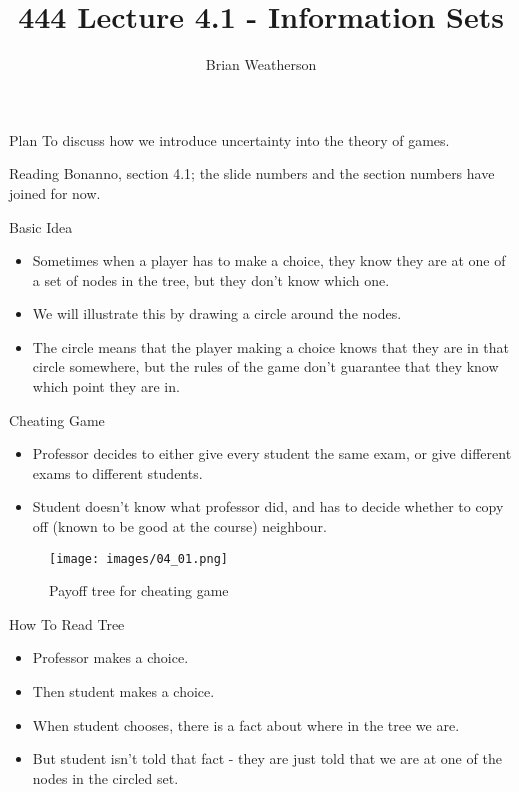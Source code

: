 \documentclass[
  ignorenonframetext,
]{beamer}
\title{444 Lecture 4.1 - Information Sets}
\author{Brian Weatherson}
\date{}
\providecommand{\tightlist}{%
  \setlength{\itemsep}{0pt}\setlength{\parskip}{0pt}}
\begin{document}
\frame{\titlepage}

\begin{frame}{Plan}
\protect\hypertarget{plan}{}
To discuss how we introduce uncertainty into the theory of games.
\end{frame}

\begin{frame}{Reading}
\protect\hypertarget{reading}{}
Bonanno, section 4.1; the slide numbers and the section numbers have
joined for now.
\end{frame}

\begin{frame}{Basic Idea}
\protect\hypertarget{basic-idea}{}
\begin{itemize}
\tightlist
\item
  Sometimes when a player has to make a choice, they know they are at
  one of a set of nodes in the tree, but they don't know which one.
\item
  We will illustrate this by drawing a circle around the nodes.
\item
  The circle means that the player making a choice knows that they are
  in that circle somewhere, but the rules of the game don't guarantee
  that they know which point they are in.
\end{itemize}
\end{frame}

\begin{frame}{Cheating Game}
\protect\hypertarget{cheating-game}{}
\begin{itemize}
\tightlist
\item
  Professor decides to either give every student the same exam, or give
  different exams to different students.
\item
  Student doesn't know what professor did, and has to decide whether to
  copy off (known to be good at the course) neighbour.
\end{itemize}
\end{frame}

\begin{frame}
\begin{figure}
\centering
\texttt{[image: images/04\_01.png]}
\caption{Payoff tree for cheating game}
\end{figure}
\end{frame}

\begin{frame}{How To Read Tree}
\protect\hypertarget{how-to-read-tree}{}
\begin{itemize}
\tightlist
\item
  Professor makes a choice.
\item
  Then student makes a choice.
\item
  When student chooses, there is a fact about where in the tree we are.
\item
  But student isn't told that fact - they are just told that we are at
  one of the nodes in the circled set.
\end{itemize}
\end{frame}
\end{document}

